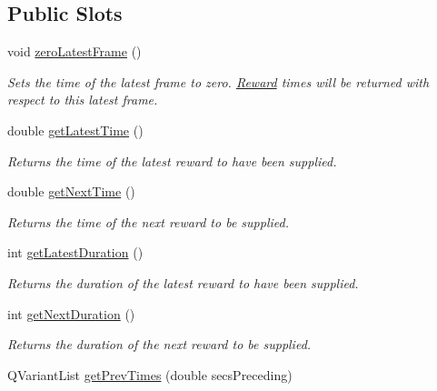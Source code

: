 \subsection*{Public Slots}
\begin{DoxyCompactItemize}
\item 
\hypertarget{class_picto_1_1_analysis_reward_data_a30d500ea11f3215a73f8bd0188132a9a}{void \hyperlink{class_picto_1_1_analysis_reward_data_a30d500ea11f3215a73f8bd0188132a9a}{zero\-Latest\-Frame} ()}\label{class_picto_1_1_analysis_reward_data_a30d500ea11f3215a73f8bd0188132a9a}

\begin{DoxyCompactList}\small\item\em Sets the time of the latest frame to zero. \hyperlink{class_picto_1_1_reward}{Reward} times will be returned with respect to this latest frame. \end{DoxyCompactList}\item 
\hypertarget{class_picto_1_1_analysis_reward_data_acd3444b576288ac5d91fe588e02e2421}{double \hyperlink{class_picto_1_1_analysis_reward_data_acd3444b576288ac5d91fe588e02e2421}{get\-Latest\-Time} ()}\label{class_picto_1_1_analysis_reward_data_acd3444b576288ac5d91fe588e02e2421}

\begin{DoxyCompactList}\small\item\em Returns the time of the latest reward to have been supplied. \end{DoxyCompactList}\item 
double \hyperlink{class_picto_1_1_analysis_reward_data_a6d72f3655688eb04f664b11a874cecc9}{get\-Next\-Time} ()
\begin{DoxyCompactList}\small\item\em Returns the time of the next reward to be supplied. \end{DoxyCompactList}\item 
\hypertarget{class_picto_1_1_analysis_reward_data_acce4a6ff27d28ccbc355be8e11e70337}{int \hyperlink{class_picto_1_1_analysis_reward_data_acce4a6ff27d28ccbc355be8e11e70337}{get\-Latest\-Duration} ()}\label{class_picto_1_1_analysis_reward_data_acce4a6ff27d28ccbc355be8e11e70337}

\begin{DoxyCompactList}\small\item\em Returns the duration of the latest reward to have been supplied. \end{DoxyCompactList}\item 
int \hyperlink{class_picto_1_1_analysis_reward_data_ac61fa207e6a1c391718f6ab9274fa1b8}{get\-Next\-Duration} ()
\begin{DoxyCompactList}\small\item\em Returns the duration of the next reward to be supplied. \end{DoxyCompactList}\item 
\hypertarget{class_picto_1_1_analysis_reward_data_a8bb9a53f0c833ba0af65c3c64e478c84}{Q\-Variant\-List \hyperlink{class_picto_1_1_analysis_reward_data_a8bb9a53f0c833ba0af65c3c64e478c84}{get\-Prev\-Times} (double secs\-Preceding)}\label{class_picto_1_1_analysis_reward_data_a8bb9a53f0c833ba0af65c3c64e478c84}


\end{DoxyCompactItemize}
